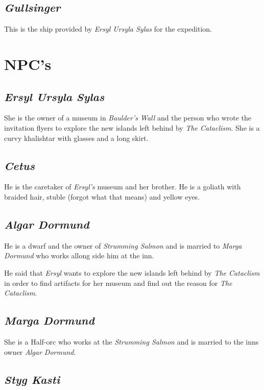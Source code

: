 \documentclass{article}
\begin{document}
\begin{multicols}{2}
    \subsection{\textit{Gullsinger}}

    This is the ship provided by \textit{Ersyl Ursyla Sylas} for the expedition.

    \section{NPC's}

    \subsection{\textit{Ersyl Ursyla Sylas}}

    She is the owner of a museum in \textit{Baulder's Wall} and the person who wrote the invitation flyers to explore the new islands left behind by \textit{The Cataclism}. She is a curvy khalishtar with glasses and a
    long skirt.

    \subsection{\textit{Cetus}}

    He is the caretaker of \textit{Ersyl's} museum and her brother. He is a goliath with braided hair, stuble (forgot what that means) and yellow eyes.

    \subsection{\textit{Algar Dormund}}

    He is a dwarf and the owner of \textit{Strumming Salmon} and is married to \textit{Marga Dormund} who works allong side him at the inn.

    He said that \textit{Ersyl} wants to explore the new islands left behind by \textit{The Cataclism} in order to find artifacts for her museum and find out the reason for \textit{The Cataclism}.

    \subsection{\textit{Marga Dormund}}

    She is a Half-orc who works at the \textit{Strumming Salmon} and is married to the inns owner \textit{Algar Dormund}.

    \subsection{\textit{Styg Kasti}}


\end{multicols}
\end{document}

